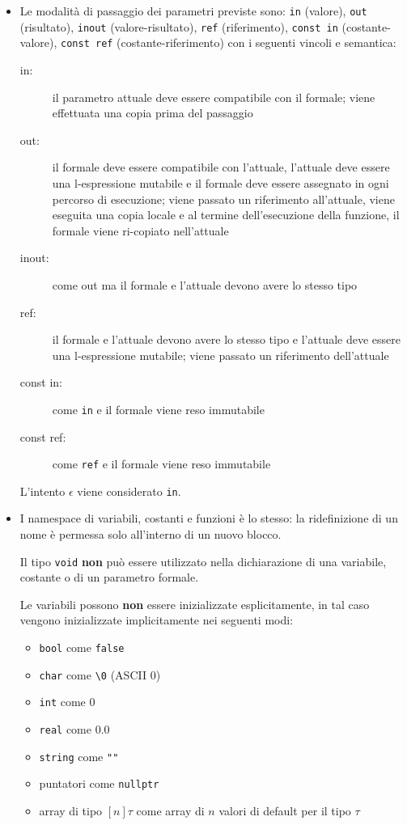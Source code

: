 \documentclass{report}
\newcommand{\term}[1]{\texttt{#1}}
\begin{document}
\begin {itemize}
    Le guardie di costrutti di iterazione indeterminata e condizionali devono avere tipo \term{bool}

    \item Le modalità di passaggio dei parametri previste sono: \term{in} (valore),
    \term{out} (risultato), \term{inout} (valore-risultato), \term{ref} (riferimento),
    \term{const in} (costante-valore), \term{const ref} (costante-riferimento) con i
    seguenti vincoli e semantica:
    \begin{description}
        \item[in:] il parametro attuale deve essere compatibile con il formale;
            viene effettuata una copia prima del passaggio
        \item[out:] il formale deve essere compatibile con l'attuale, l'attuale
            deve essere una l-espressione mutabile e il formale deve essere assegnato
            in ogni percorso di esecuzione; viene passato un riferimento all'attuale,
            viene eseguita una copia locale e al termine dell'esecuzione della funzione,
            il formale viene ri-copiato nell'attuale
        \item[inout:] come out ma il formale e l'attuale devono avere lo stesso tipo
        \item[ref:] il formale e l'attuale devono avere lo stesso tipo e l'attuale deve
            essere una l-espressione mutabile; viene passato un riferimento dell'attuale
        \item[const in:] come \term{in} e il formale viene reso immutabile
        \item[const ref:] come \term{ref} e il formale viene reso immutabile

    \end{description}
    L'intento $\epsilon$ viene considerato \term{in}.

    \item I namespace di variabili, costanti e funzioni è lo stesso: la ridefinizione di un nome
    è permessa solo all'interno di un nuovo blocco.

    Il tipo \term{void} \textbf{non} può essere utilizzato nella dichiarazione di una variabile,
    costante o di un parametro formale.

    Le variabili possono \textbf{non} essere inizializzate esplicitamente, in tal caso
    vengono inizializzate implicitamente nei seguenti modi:
    \begin{itemize}
        \item \term{bool} come \term{false}
        \item \term{char} come \texttt{\textbackslash 0} (ASCII 0)
        \item \term{int} come 0
        \item \term{real} come 0.0
        \item \term{string} come \term{""}
        \item puntatori come \term{nullptr}
        \item array di tipo $[n]\tau$ come array di $n$ valori di default
            per il tipo $\tau$
        

\end{itemize}
\end{itemize}
\end{document}
